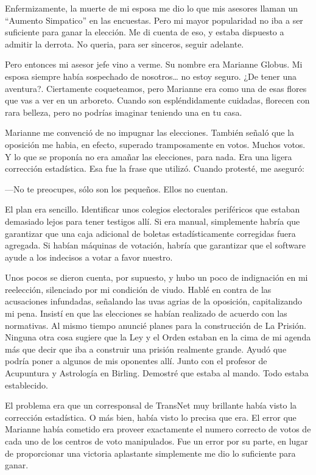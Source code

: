 Enfermizamente, la muerte de mi esposa me dio lo que mis asesores llaman
un ``Aumento Simpatico'' en las encuestas. Pero mi mayor popularidad no
iba a ser suficiente para ganar la elección. Me di cuenta de eso, y
estaba dispuesto a admitir la derrota. No queria, para ser sinceros,
seguir adelante.

Pero entonces mi asesor jefe vino a verme. Su nombre era Marianne
Globus. Mi esposa siempre había sospechado de nosotros\ldots{} no estoy
seguro. ¿De tener una aventura?. Ciertamente coqueteamos, pero Marianne
era como una de esas flores que vas a ver en un arboreto. Cuando son
espléndidamente cuidadas, florecen con rara belleza, pero no podrías
imaginar teniendo una en tu casa.

Marianne me convenció de no impugnar las elecciones. También señaló que
la oposición me habia, en efecto, superado tramposamente en votos.
Muchos votos. Y lo que se proponía no era amañar las elecciones, para
nada. Era una ligera corrección estadística. Esa fue la frase que
utilizó. Cuando protesté, me aseguró:~

---No te preocupes, sólo son los pequeños. Ellos no cuentan.

El plan era sencillo. Identificar unos colegios electorales periféricos
que estaban demasiado lejos para tener testigos allí. Si era manual,
simplemente habría que garantizar que una caja adicional de boletas
estadísticamente corregidas fuera agregada. Si habían máquinas de
votación, habría que garantizar que el software ayude a los indecisos a
votar a favor nuestro.

Unos pocos se dieron cuenta, por supuesto, y hubo un poco de indignación
en mi reelección, silenciado por mi condición de viudo. Hablé en contra
de las acusaciones infundadas, señalando las uvas agrias de la
oposición, capitalizando mi pena. Insistí en que las elecciones se
habían realizado de acuerdo con las normativas. Al mismo tiempo anuncié
planes para la construcción de La Prisión. Ninguna otra cosa sugiere que
la Ley y el Orden estaban en la cima de mi agenda más que decir que iba
a construir una prisión realmente grande. Ayudó que podría poner a
algunos de mis oponentes allí. Junto con el profesor de Acupuntura y
Astrología en Birling. Demostré que estaba al mando. Todo estaba
establecido.

El problema era que un corresponsal de TransNet muy brillante había
visto la corrección estadística. O más bien, había visto lo precisa que
era. El error que Marianne había cometido era proveer exactamente el
numero correcto de votos de cada uno de los centros de voto manipulados.
Fue un error por su parte, en lugar de proporcionar una victoria
aplastante simplemente me dio lo suficiente para ganar.

